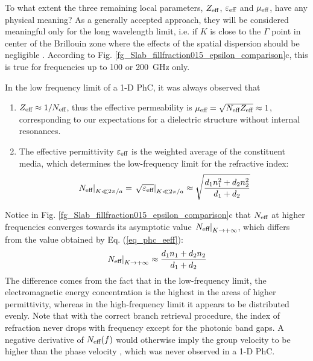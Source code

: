 To what extent the three remaining local parameters, $Z_{\text{eff} }$, $\varepsilon_{\text{eff} }$ and $\mu_{\text{eff} }$, have any physical meaning? As a generally accepted approach, they will be considered meaningful only for the long wavelength limit, i.e. if $K$ is close to the $\Gamma$ point in center of the Brillouin zone where the effects of the spatial dispersion should be negligible \cite{silveirinha2009nonlocal}. According to Fig. \ref{fg_Slab_fillfraction015_epsilon_comparison}c, this is true for frequencies up to 100 or 200~GHz only. 

In the low frequency limit of a 1-D PhC, it was always observed that
\begin{enumerate}
\item{$Z_{\text{eff} } \approx 1/N_{\text{eff} }$, thus the effective permeability is $\mu_{\text{eff} } = \sqrt{N_{\text{eff} }Z_{\text{eff} }} \approx 1$, corresponding to our expectations for a dielectric structure without internal resonances.} 
\item{The effective permittivity $\varepsilon_{\text{eff} }$ is the weighted average of the constituent media, which determines the low-frequency limit for the refractive index:
	\begin{equation} \left.N_{\text{eff} }\right|_{K\ll 2\pi/a} =\left. \sqrt{\varepsilon_{\text{eff} }}\right|_{K\ll 2\pi/a} \approx \sqrt{\frac{d_1 n_1^{2} + d_2 n_2^{2}}{d_1+d_2}} \label{eq_phc_eeff}\end{equation}
	}
\end{enumerate}
Notice in Fig. \ref{fg_Slab_fillfraction015_epsilon_comparison}c that $N_{\text{eff} }$ at higher frequencies converges towards its asymptotic value $\left.N_{\text{eff} }\right|_{K\rightarrow +\infty}$, which differs from the value obtained by Eq. (\ref{eq_phc_eeff}):
\begin{equation} \left.N_{\text{eff} }\right|_{K\rightarrow +\infty} \approx \frac{d_1 n_1 + d_2 n_2}{d_1+d_2} \label{eq_phc_neff}\end{equation}
The difference comes from the fact that in the low-frequency limit, the electromagnetic energy concentration is the highest in the areas of higher permittivity, whereas in the high-frequency limit it appears to be distributed evenly.
Note that with the correct branch retrieval procedure, the index of refraction never drops with frequency except for the photonic band gaps. A negative derivative of $N_{\text{eff} }(f)$ would otherwise imply the group velocity to be higher than the phase velocity \cite{mikki2009electromagnetic}, which was never observed in a 1-D PhC.

